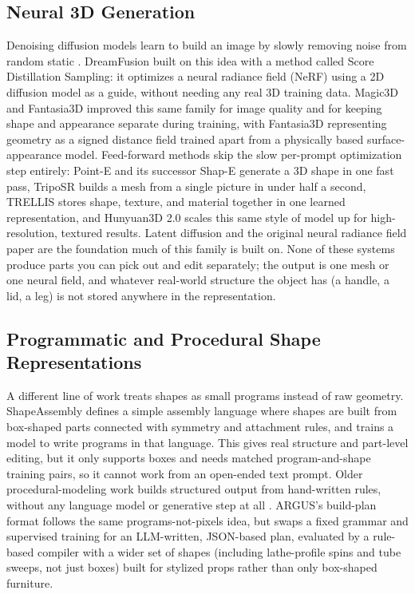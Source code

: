 \documentclass[conference]{IEEEtran}
\begin{document}
\subsection{Neural 3D Generation}
Denoising diffusion models learn to build an image by slowly removing noise from random static \cite{ho2020ddpm}. DreamFusion \cite{poole2023dreamfusion} built on this idea with a method called Score Distillation Sampling: it optimizes a neural radiance field (NeRF) using a 2D diffusion model as a guide, without needing any real 3D training data. Magic3D \cite{lin2023magic3d} and Fantasia3D \cite{chen2023fantasia3d} improved this same family for image quality and for keeping shape and appearance separate during training, with Fantasia3D representing geometry as a signed distance field trained apart from a physically based surface-appearance model. Feed-forward methods skip the slow per-prompt optimization step entirely: Point-E \cite{nichol2022pointe} and its successor Shap-E \cite{jun2023shape} generate a 3D shape in one fast pass, TripoSR \cite{tochilkin2024triposr} builds a mesh from a single picture in under half a second, TRELLIS \cite{xiang2024trellis} stores shape, texture, and material together in one learned representation, and Hunyuan3D 2.0 \cite{hunyuan3d2025} scales this same style of model up for high-resolution, textured results. Latent diffusion \cite{rombach2022ldm} and the original neural radiance field paper \cite{mildenhall2020nerf} are the foundation much of this family is built on. None of these systems produce parts you can pick out and edit separately; the output is one mesh or one neural field, and whatever real-world structure the object has (a handle, a lid, a leg) is not stored anywhere in the representation.

\subsection{Programmatic and Procedural Shape Representations}
A different line of work treats shapes as small programs instead of raw geometry. ShapeAssembly \cite{jones2020shapeassembly} defines a simple assembly language where shapes are built from box-shaped parts connected with symmetry and attachment rules, and trains a model to write programs in that language. This gives real structure and part-level editing, but it only supports boxes and needs matched program-and-shape training pairs, so it cannot work from an open-ended text prompt. Older procedural-modeling work builds structured output from hand-written rules, without any language model or generative step at all \cite{merrell2011modelsynthesis}. ARGUS's build-plan format follows the same programs-not-pixels idea, but swaps a fixed grammar and supervised training for an LLM-written, JSON-based plan, evaluated by a rule-based compiler with a wider set of shapes (including lathe-profile spins and tube sweeps, not just boxes) built for stylized props rather than only box-shaped furniture.
\end{document}
